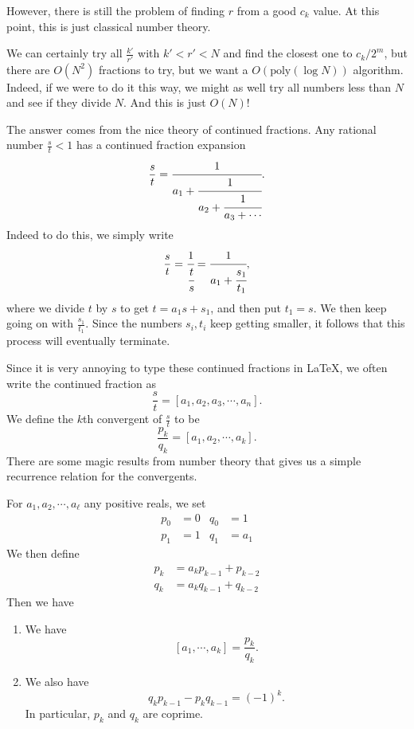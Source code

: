 \documentclass[a4paper]{article}
\begin{document}
However, there is still the problem of finding $r$ from a good $c_k$ value. At this point, this is just classical number theory.

We can certainly try all $\frac{k'}{r'}$ with $k' < r' < N$ and find the closest one to $c_k/2^m$, but there are $O(N^2)$ fractions to try, but we want a $O(\mathrm{poly}(\log N))$ algorithm. Indeed, if we were to do it this way, we might as well try all numbers less than $N$ and see if they divide $N$. And this is just $O(N)$!

The answer comes from the nice theory of continued fractions. Any rational number $\frac{s}{t} < 1$ has a continued fraction expansion
\[
  \frac{s}{t} = \cfrac{1}{a_1 + \cfrac{1}{a_2 + \cfrac{1}{a_3 + \cdots}}}.
\]
Indeed to do this, we simply write
\[
  \frac{s}{t} = \cfrac{1}{\cfrac{t}{s}} = \cfrac{1}{a_1 + \cfrac{s_1}{t_1}},
\]
where we divide $t$ by $s$ to get $t = a_1s + s_1$, and then put $t_1 = s$. We then keep going on with $\frac{s_1}{t_1}$. Since the numbers $s_i, t_i$ keep getting smaller, it follows that this process will eventually terminate.

Since it is very annoying to type these continued fractions in \LaTeX, we often write the continued fraction as
\[
  \frac{s}{t} = [a_1, a_2, a_3, \cdots, a_n].
\]
We define the $k$th convergent of $\frac{s}{t}$ to be
\[
  \frac{p_k}{q_k} = [a_1, a_2, \cdots, a_k].
\]
There are some magic results from number theory that gives us a simple recurrence relation for the convergents.
\begin{lemma}
  For $a_1, a_2, \cdots, a_\ell$ any positive reals, we set
  \begin{align*}
    p_0 &= 0 & q_0 &= 1\\
    p_1 &= 1 & q_1 &= a_1
  \end{align*}
  We then define
  \begin{align*}
    p_k &= a_k p_{k - 1} + p_{k - 2}\\
    q_k &= a_k q_{k - 1} + q_{k - 2}
  \end{align*}
  Then we have
  \begin{enumerate}
    \item We have
      \[
        [a_1, \cdots, a_k] = \frac{p_k}{q_k}.
      \]
    \item We also have
      \[
        q_k p_{k - 1} - p_k q_{k - 1} = (-1)^k.
      \]
      In particular, $p_k$ and $q_k$ are coprime.
  \end{enumerate}
\end{lemma}
\end{document}
